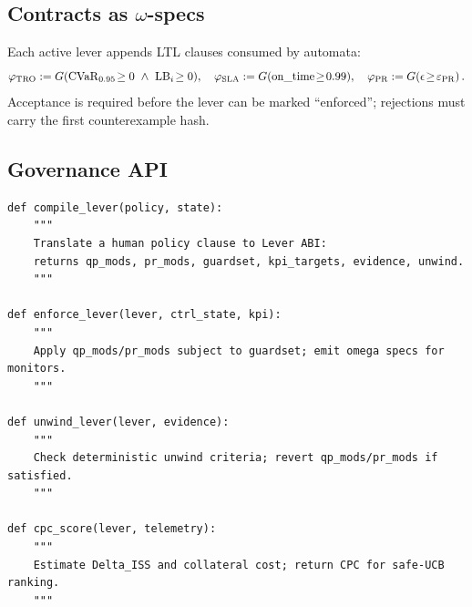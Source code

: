 \subsection{Contracts as $\omega$-specs}\label{subsec:gov-omega}
\emph{}

Each active lever appends LTL clauses consumed by automata:
\[
\varphi_{\text{TRO}}:=G(\mathrm{CVaR}_{0.95}\!\ge0\ \wedge\ \mathrm{LB}_i\!\ge0),\quad
\varphi_{\text{SLA}}:=G(\text{on\_time}\!\ge\!0.99),\quad
\varphi_{\text{PR}}:=G(\epsilon\!\ge\!\constsymPRmargin)\,.
\]
Acceptance is required before the lever can be marked “enforced”; rejections must carry the first counterexample hash. 

\subsection{Governance API}\label{subsec:gov-api}
\emph{}
\begin{lstlisting}
def compile_lever(policy, state):
    """
    Translate a human policy clause to Lever ABI:
    returns qp_mods, pr_mods, guardset, kpi_targets, evidence, unwind.
    """

def enforce_lever(lever, ctrl_state, kpi):
    """
    Apply qp_mods/pr_mods subject to guardset; emit omega specs for monitors.
    """

def unwind_lever(lever, evidence):
    """
    Check deterministic unwind criteria; revert qp_mods/pr_mods if satisfied.
    """

def cpc_score(lever, telemetry):
    """
    Estimate Delta_ISS and collateral cost; return CPC for safe-UCB ranking.
    """
\end{lstlisting}

